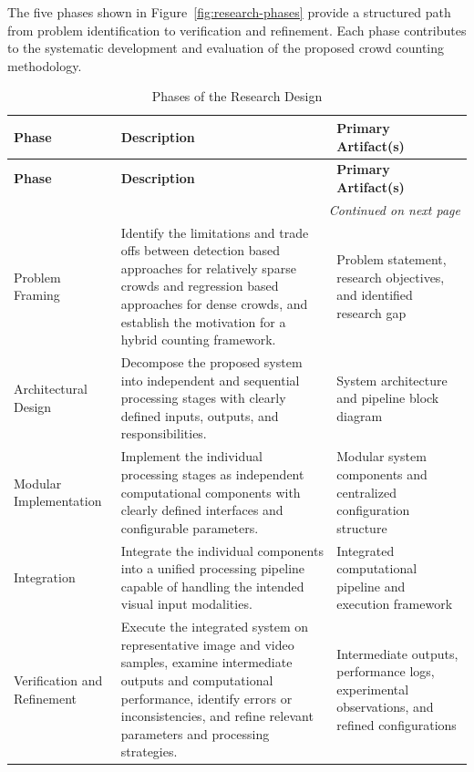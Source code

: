 \documentclass[12pt,a4paper]{report}
\begin{document}
The five phases shown in Figure~\ref{fig:research-phases} provide a structured path from problem identification to verification and refinement. Each phase contributes to the systematic development and evaluation of the proposed
crowd counting methodology.


\begin{longtable}{|p{}|p{}|p{}|}

\caption{Phases of the Research Design}
\label{tab:research-design}\\

\hline
\textbf{Phase} & \textbf{Description} & \textbf{Primary Artifact(s)} \\
\hline
\endfirsthead

\hline
\textbf{Phase} & \textbf{Description} & \textbf{Primary Artifact(s)} \\
\hline
\endhead

\hline
\multicolumn{3}{r}{\textit{Continued on next page}} \\
\endfoot

\hline
\endlastfoot

Problem Framing &
Identify the limitations and trade offs between detection based approaches for relatively sparse crowds and regression based approaches for dense crowds, and establish the motivation for a hybrid counting framework. &
Problem statement, research objectives, and identified research gap \\
\hline

Architectural Design &
Decompose the proposed system into independent and sequential processing stages with clearly defined inputs, outputs, and responsibilities. &
System architecture and pipeline block diagram \\
\hline

Modular Implementation & Implement the individual processing stages as independent computational components with clearly defined interfaces and configurable parameters. & Modular system components and centralized configuration structure \\

\hline

Integration & Integrate the individual components into a unified processing pipeline capable of handling the intended visual input modalities. & Integrated computational pipeline and execution framework \\

\hline

Verification and Refinement & Execute the integrated system on representative image and video samples, examine intermediate outputs and computational performance, identify errors or inconsistencies, and refine relevant parameters and processing strategies. & Intermediate outputs, performance logs, experimental observations, and refined configurations \\

\hline
\end{longtable}
\end{document}
